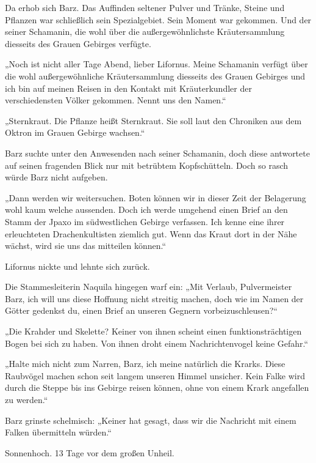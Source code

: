 Da erhob sich Barz. Das Auffinden seltener Pulver und Tränke, Steine und Pflanzen war schließlich sein Spezialgebiet. Sein Moment war gekommen. Und der seiner Schamanin, die wohl über die außergewöhnlichste Kräutersammlung diesseits des Grauen Gebirges verfügte.

„Noch ist nicht aller Tage Abend, lieber Lifornus. Meine Schamanin verfügt über die wohl außergewöhnliche Kräutersammlung diesseits des Grauen Gebirges und ich bin auf meinen Reisen in den Kontakt mit Kräuterkundler der verschiedensten Völker gekommen. Nennt uns den Namen.“

„Sternkraut. Die Pflanze heißt Sternkraut. Sie soll laut den Chroniken aus dem Oktron im Grauen Gebirge wachsen.“

Barz suchte unter den Anwesenden nach seiner Schamanin, doch diese antwortete auf seinen fragenden Blick nur mit betrübtem Kopfschütteln. Doch so rasch würde Barz nicht aufgeben.

„Dann werden wir weitersuchen. Boten können wir in dieser Zeit der Belagerung wohl kaum welche aussenden. Doch ich werde umgehend einen Brief an den Stamm der Jpaxo im südwestlichen Gebirge verfassen. Ich kenne eine ihrer erleuchteten Drachenkultisten ziemlich gut. Wenn das Kraut dort in der Nähe wächst, wird sie uns das mitteilen können.“

Lifornus nickte und lehnte sich zurück.

Die Stammesleiterin Naquila hingegen warf ein: „Mit Verlaub, Pulvermeister Barz, ich will uns diese Hoffnung nicht streitig machen, doch wie im Namen der Götter gedenkst du, einen Brief an unseren Gegnern vorbeizuschleusen?“

„Die Krahder und Skelette? Keiner von ihnen scheint einen funktionsträchtigen Bogen bei sich zu haben. Von ihnen droht einem Nachrichtenvogel keine Gefahr.“

„Halte mich nicht zum Narren, Barz, ich meine natürlich die Krarks. Diese Raubvögel machen schon seit langem unseren Himmel unsicher. Kein Falke wird durch die Steppe bis ins Gebirge reisen können, ohne von einem Krark angefallen zu werden.“

Barz grinste schelmisch: „Keiner hat gesagt, dass wir die Nachricht mit einem Falken übermitteln würden.“\bigskip







Sonnenhoch. 13 Tage vor dem großen Unheil.\bigskip



